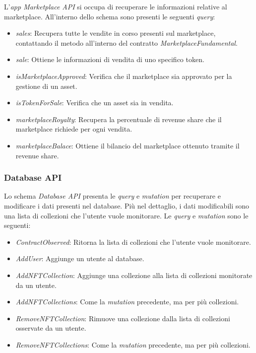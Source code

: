 L'\textit{app Marketplace API} si occupa di recuperare le informazioni relative al marketplace. All'interno dello schema sono presenti le seguenti \textit{query}:

\begin{itemize}
    \item  \textit{sales}: Recupera tutte le vendite in corso presenti sul marketplace, contattando il metodo all'interno del contratto \textit{MarketplaceFundamental}.
    \item \textit{sale}: Ottiene le informazioni di vendita di uno specifico token.
    \item \textit{isMarketplaceApproved}: Verifica che il marketplace sia approvato per la gestione di un asset.
    \item \textit{isTokenForSale}: Verifica che un asset sia in vendita.
    \item \textit{marketplaceRoyalty}: Recupera la percentuale di revenue share che il marketplace richiede per ogni vendita.
    \item \textit{marketplaceBalace}: Ottiene il bilancio del marketplace ottenuto tramite il revenue share.
\end{itemize}

\subsubsection{Database API}

Lo schema \textit{Database API} presenta le \textit{query} e \textit{mutation} per recuperare e modificare i dati presenti nel database. Più nel dettaglio, i dati modificabili sono una lista di collezioni che l'utente vuole monitorare. Le \textit{query} e \textit{mutation} sono le seguenti:

\begin{itemize}
    \item \textit{ContractObserved}: Ritorna la lista di collezioni che l'utente vuole monitorare.
    \item \textit{AddUser}: Aggiunge un utente al database.
    \item \textit{AddNFTCollection}: Aggiunge una collezione alla lista di collezioni monitorate da un utente.
    \item \textit{AddNFTCollections}: Come la \textit{mutation} precedente, ma per più collezioni.
    \item \textit{RemoveNFTCollection}: Rimuove una collezione dalla lista di collezioni osservate da un utente.
    \item \textit{RemoveNFTCollections}: Come la \textit{mutation} precedente, ma per più collezioni.
\end{itemize}

